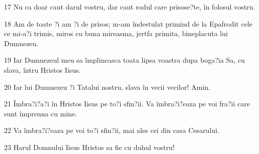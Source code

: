\par 17 Nu ca doar caut darul vostru, dar caut rodul care prisose?te, în folosul vostru.
\par 18 Am de toate ?i am ?i de prisos; m-am îndestulat primind de la Epafrodit cele ce mi-a?i trimis, miros cu buna mireasma, jertfa primita, bineplacuta lui Dumnezeu.
\par 19 Iar Dumnezeul meu sa împlineasca toata lipsa voastra dupa boga?ia Sa, cu slava, întru Hristos Iisus.
\par 20 Iar lui Dumnezeu ?i Tatalui nostru, slava în vecii vecilor! Amin.
\par 21 Îmbra?i?a?i în Hristos Iisus pe to?i sfin?ii. Va îmbra?i?eaza pe voi fra?ii care sunt împreuna cu mine.
\par 22 Va îmbra?i?eaza pe voi to?i sfin?ii, mai ales cei din casa Cesarului.
\par 23 Harul Domnului Iisus Hristos sa fie cu duhul vostru!


